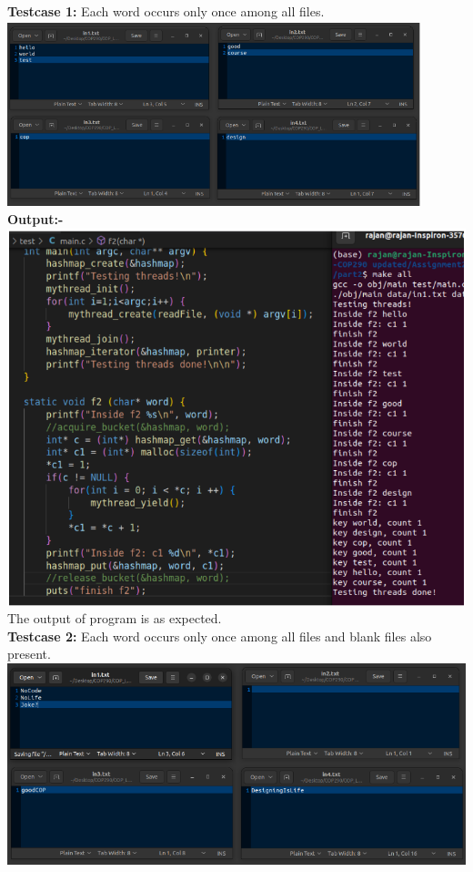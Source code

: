 \documentclass[12pt]{article}
\begin{document}
\begin{spacing}{1.2}
\textbf{Testcase 1:} Each word occurs only once among all files.\\
\includegraphics[width=12cm]{images/18.png}\\
\textbf{Output:-}\\
\includegraphics[width=14cm]{images/19.png}\\
The output of program is as expected.\\
    \newpage
\textbf{Testcase 2:} Each word occurs only once among all files and blank files also present.\\
\includegraphics[width=14cm]{images/20.png}\\

\end{spacing}
\end{document}
